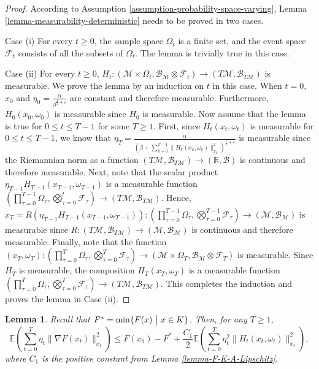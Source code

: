 \documentclass{amsart}
\newcommand{\E}{\mathbb{E}}
\newcommand{\R}{\mathbb{R}}
\newcommand{\fil}{\mathcal{F}}
\newcommand{\ve}{\varepsilon}
\newcommand{\M}{\mathcal{M}}
\newcommand{\B}{\mathcal{B}}
\theoremstyle{plain}
\newtheorem{lemma}[theorem]{Lemma}
\theoremstyle{definition}
\theoremstyle{remark}
\numberwithin{theorem}{section}
\numberwithin{equation}{section}
\begin{document}
\begin{proof}
According to Assumption \ref{assumption-probability-space-varying}, Lemma \ref{lemma-measurability-deterministic} needs to be proved in two cases.

Case (i) For every $t\geq 0$, the sample space $\Omega_t$ is a finite set, and the event space $\fil_t$ consists of all the subsets of $\Omega_t$. The lemma is trivially true in this case. 

Case (ii) For every $t\geq 0$, $H_t:(\M \times \Omega_t, \B_{\M}\otimes \fil_t) \rightarrow (T\M, \B_{T\M})$ is measurable. We prove the lemma by an induction on $t$ in this case. When $t=0$, $x_0$ and $\eta_0=\frac{\alpha}{\beta^{\frac{1}{2}+\ve}}$ are constant and therefore measurable. Furthermore, $H_0(x_0,\omega_0)$ is measurable since $H_0$ is measurable. Now assume that the lemma is true for $0\leq t \leq T-1$ for some $T\geq 1$. First, since $H_t(x_t,\omega_t)$ is measurable for $0\leq t \leq T-1$, we know that $\eta_T = \frac{\alpha}{(\beta + \sum_{k=0}^{T-1}\|H_k(x_k,\omega_k)\|_{x_k}^2)^{\frac{1}{2}+\ve}}$ is measurable since the Riemannian norm as a function $(T\M, \B_{T\M}) \rightarrow (\R, \B)$ is continuous and therefore measurable. Next, note that the scalar product $\eta_{T-1}H_{T-1}(x_{T-1}, \omega_{T-1})$ is a measurable function  $(\prod_{\tau =0}^{T-1} \Omega_\tau, \bigotimes_{\tau =0}^{t} \fil_\tau) \rightarrow (T\M, \B_{T\M})$. Hence, $x_{T}=R(\eta_{T-1}H_{T-1}(x_{T-1},\omega_{T-1})): (\prod_{\tau =0}^{T-1} \Omega_\tau, \bigotimes_{\tau =0}^{T-1} \fil_\tau) \rightarrow (\M, \B_{\M})$ is measurable since $R:(T\M,\B_{T\M}) \rightarrow (\M,\B_{\M})$ is continuous and therefore measurable.  Finally, note that the function $(x_T,\omega_T): (\prod_{\tau =0}^{T} \Omega_\tau, \bigotimes_{\tau =0}^{T} \fil_\tau) \rightarrow (\M\times \Omega_T, \B_{\M}\otimes \fil_T)$ is measurable. Since $H_T$ is measurable, the composition $H_T(x_T,\omega_T)$ is a measurable function $(\prod_{\tau =0}^{T} \Omega_\tau, \bigotimes_{\tau =0}^{T} \fil_\tau) \rightarrow (T\M, \B_{T\M})$. This completes the induction and proves the lemma in Case (ii).
\end{proof}

\begin{lemma}\label{lemma-bound-F-gradient-sum}
Recall that $F^{\ast}= \min\{F(x)~\big{|}~x\in K\}$. Then, for any $T\geq 1$, 
\begin{equation}\label{eq-bound-F-gradient-sum}
\E(\sum_{t=0}^T \eta_t \|\nabla F(x_t)\|_{x_t}^2) \leq F(x_0) - F^{\ast} + \frac{C_1}{2}\E(\sum_{t=0}^T \eta_t^2 \|H_t(x_t,\omega_t)\|_{x_t}^2),
\end{equation}
where $C_1$ is the positive constant from Lemma \ref{lemma-F-K-A-Lipschitz}.
\end{lemma}
\end{document}
